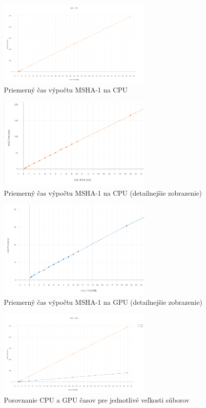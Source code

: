\documentclass[conference]{IEEEtran}
\begin{document}
\begin{figure}[h!]
\centering
\includegraphics[width=3in]{img/AVG-CPU-new}
\caption{Priemerný čas výpočtu MSHA-1 na CPU}
\end{figure}

\begin{figure}[h!]
\centering
\includegraphics[width=3in]{img/AVG-CPU-new2}
\caption{Priemerný čas výpočtu MSHA-1 na CPU  (detailnejšie zobrazenie)}
\end{figure}


\begin{figure}[h!]
\centering
\includegraphics[width=3in]{img/AVG-GPU-new3}
\caption{Priemerný čas výpočtu MSHA-1 na GPU (detailnejšie zobrazenie)}
\end{figure}

\begin{figure}[h!]
\centering
\includegraphics[width=3in]{img/CPU-GPU-new}
\caption{Porovnanie CPU a GPU časov pre jednotlivé veľkosti súborov}
\end{figure}
\end{document}
